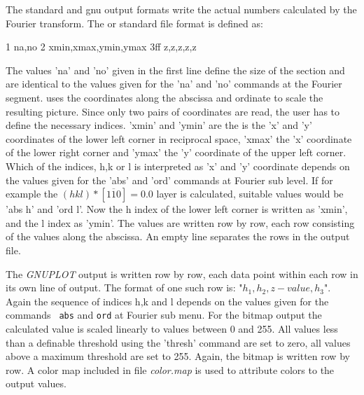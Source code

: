 %
The standard and gnu output formats write the actual numbers calculated by the
Fourier transform.  The {\Kuplot} or standard file format is defined as:
%
\begin{MacVerbatim}
    1      na,no
    2      xmin,xmax,ymin,ymax
    3ff    z,z,z,z,z
\end{MacVerbatim}
%
The values 'na' and 'no' given in the first line define the size of
the section and are identical to the values given for the 'na' and
'no' commands at the Fourier segment.  {\Kuplot} uses the
coordinates along the abscissa and ordinate to scale the resulting
picture.  Since only two pairs of coordinates are read, the user has
to define the necessary indices. 'xmin' and 'ymin' are the is the
'x' and 'y' coordinates of the lower left corner in reciprocal
space, 'xmax' the 'x' coordinate of the lower right corner and
'ymax' the 'y' coordinate of the upper left corner.  Which of the
indices, h,k or l is interpreted as 'x' and 'y' coordinate depends
on the values given for the 'abs' and 'ord' commands at Fourier
sub level.  If for example the $(hkl)*[1 \overline{1} 0] = 0.0$ layer
is calculated, suitable values would be 'abs h' and 'ord l'. Now the
h index of the lower left corner is written as 'xmin', and the l
index as 'ymin'.  The values are written row by row, each row
consisting of the values along the abscissa.  An empty line
separates the rows in the output file.\par

The {\it GNUPLOT} output is written row by row, each data point
within each row in its own line of output.  The format of one such
row is: "$ h_{1}, h_{2}, z-value, h_{3}$".  Again the sequence of
indices h,k and l depends on the values given for the commands {\tt
abs} and {\tt ord} at Fourier sub menu. For the bitmap output the
calculated value is scaled linearly to values between 0 and 255. All
values less than a definable threshold using the 'thresh' command
are set to zero, all values above a maximum threshold are set to
255. Again, the bitmap is written row by row.  A color map included
in file {\it color.map} is used to attribute colors to the output
values.

